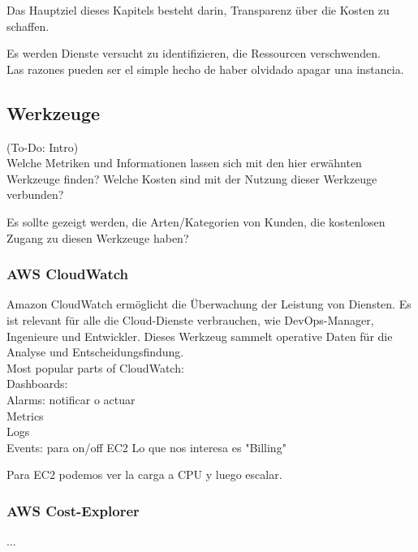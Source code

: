 Das Hauptziel dieses Kapitels besteht darin, Transparenz über die Kosten zu schaffen.

Es werden Dienste versucht zu identifizieren, die Ressourcen verschwenden.
\\
Las razones pueden ser el simple hecho de haber olvidado apagar una instancia.
\subsection{Werkzeuge}
(To-Do: Intro)\\


Welche Metriken und Informationen lassen sich mit den hier erwähnten Werkzeuge finden?
Welche Kosten sind mit der Nutzung dieser Werkzeuge verbunden?


Es sollte gezeigt werden, die Arten/Kategorien von Kunden, die kostenlosen Zugang zu diesen Werkzeuge haben?


\subsubsection{AWS CloudWatch}

Amazon CloudWatch ermöglicht die Überwachung der Leistung von Diensten. Es ist relevant für alle die Cloud-Dienste verbrauchen, wie DevOps-Manager, Ingenieure und Entwickler. Dieses Werkzeug sammelt operative Daten für die Analyse und Entscheidungsfindung.
\\
Most popular parts of CloudWatch:
\\
Dashboards:
\\
Alarms: notificar o actuar
\\
Metrics
\\
Logs
\\
Events: para on/off EC2
Lo que nos interesa es "Billing"


Para EC2 podemos ver la carga a CPU y luego escalar.

\subsubsection{AWS Cost-Explorer}
...

